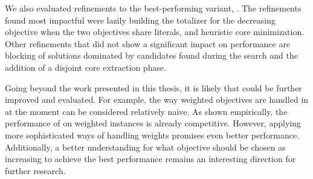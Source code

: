 We also evaluated refinements to the best-performing variant, \msh{}.
The refinements found most impactful were lazily building the totalizer for the decreasing objective when the two objectives share literals, and heuristic core minimization.
Other refinements that did not show a significant impact on performance are blocking of solutions dominated by candidates found during the search and the addition of a disjoint core extraction phase.

Going beyond the work presented in this thesis, it is likely that \algname{} could be further improved and evaluated.
For example, the way weighted objectives are handled in \algname{} at the moment can be considered relatively naive.
As shown empirically, the performance of \algname{} on weighted instances is already competitive.
However, applying more sophisticated ways of handling weights promises even better performance.
Additionally, a better understanding for what objective should be chosen as increasing to achieve the best performance remains an interesting direction for further research.